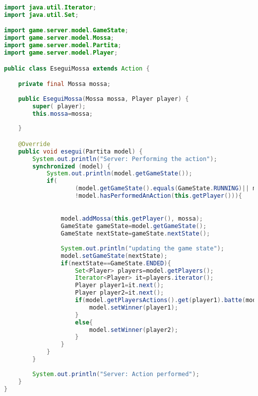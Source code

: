 \documentclass{article}
\begin{document}
\begin{lstlisting}[language=Java,escapechar=|]
import java.util.Iterator;
import java.util.Set;

import game.server.model.GameState;
import game.server.model.Mossa;
import game.server.model.Partita;
import game.server.model.Player;

public class EseguiMossa extends Action {

	private final Mossa mossa;
	
	public EseguiMossa(Mossa mossa, Player player) {
		super( player);
		this.mossa=mossa;
		
	}

	@Override
	public void esegui(Partita model) {
		System.out.println("Server: Performing the action");
		synchronized (model) {
			System.out.println(model.getGameState());
			if(
					(model.getGameState().equals(GameState.RUNNING)|| model.getGameState().equals(GameState.ONE_MOSSA_RECEIVED)) && 
					!model.hasPerformedAnAction(this.getPlayer())){
				

				model.addMossa(this.getPlayer(), mossa);
				GameState gameState=model.getGameState();
				GameState nextState=gameState.nextState();
				
				System.out.println("updating the game state");
				model.setGameState(nextState);
				if(nextState==GameState.ENDED){
					Set<Player> players=model.getPlayers();
					Iterator<Player> it=players.iterator();
					Player player1=it.next();
					Player player2=it.next();
					if(model.getPlayersActions().get(player1).batte(model.getPlayersActions().get(player2))){
						model.setWinner(player1);
					}
					else{
						model.setWinner(player2);
					}
				}	
			}
		}
		
		System.out.println("Server: Action performed");
	}
}
\end{lstlisting}
\end{document}
